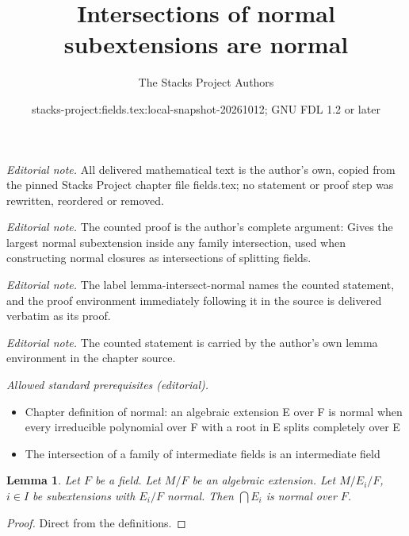\documentclass[10pt,a4paper]{amsart}
\title{Intersections of normal subextensions are normal}
\author{The Stacks Project Authors}
\date{stacks-project:fields.tex:local-snapshot-20261012; GNU FDL 1.2 or later}
\theoremstyle{plain}
\newtheorem{lemma}[subsection]{Lemma}
\theoremstyle{definition}
\theoremstyle{remark}
\numberwithin{equation}{subsection}
\begin{document}
\maketitle
\noindent\textit{Editorial note.} All delivered mathematical text is the author's own, copied from the pinned Stacks Project chapter file fields.tex; no statement or proof step was rewritten, reordered or removed.\par\medskip
\noindent\textit{Editorial note.} The counted proof is the author's complete argument: Gives the largest normal subextension inside any family intersection, used when constructing normal closures as intersections of splitting fields.\par\medskip
\noindent\textit{Editorial note.} The label lemma-intersect-normal names the counted statement, and the proof environment immediately following it in the source is delivered verbatim as its proof.\par\medskip
\noindent\textit{Editorial note.} The counted statement is carried by the author's own lemma environment in the chapter source.\par\medskip
\noindent\textit{Allowed standard prerequisites (editorial).}\begin{itemize}
\item Chapter definition of normal: an algebraic extension E over F is normal when every irreducible polynomial over F with a root in E splits completely over E
\item The intersection of a family of intermediate fields is an intermediate field
\end{itemize}\medskip
\begin{lemma}
\label{lemma-intersect-normal}
Let $F$ be a field. Let $M/F$ be an algebraic extension. Let
$M/E_i/F$, $i \in I$ be subextensions with
$E_i/F$ normal. Then $\bigcap E_i$ is normal over $F$.
\end{lemma}

\begin{proof}
Direct from the definitions.
\end{proof}
\end{document}
